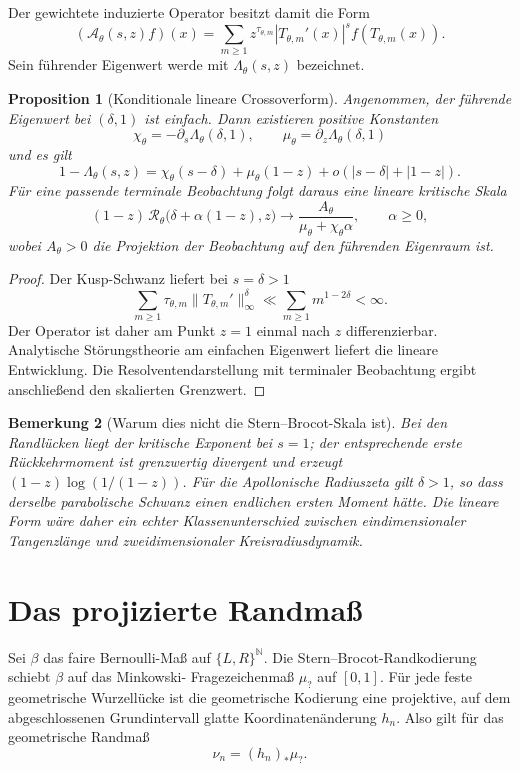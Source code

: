 \documentclass[11pt,a4paper]{article}
\newtheorem{remark}{Bemerkung}[section]
\newtheorem{proposition}[remark]{Proposition}
\begin{document}
Der gewichtete induzierte Operator besitzt damit die Form
\[
 (\mathcal A_\theta(s,z)f)(x)
 =
 \sum_{m\ge1}
 z^{\tau_{\theta,m}}
 |T_{\theta,m}'(x)|^s f(T_{\theta,m}(x)).
\]
Sein führender Eigenwert werde mit $\Lambda_\theta(s,z)$ bezeichnet.

\begin{proposition}[Konditionale lineare Crossoverform]
Angenommen, der führende
Eigenwert bei $(\delta,1)$ ist einfach. Dann existieren positive
Konstanten
\[
 \chi_\theta=-\partial_s\Lambda_\theta(\delta,1),
 \qquad
 \mu_\theta=\partial_z\Lambda_\theta(\delta,1)
\]
und es gilt
\[
 1-\Lambda_\theta(s,z)
 =
 \chi_\theta(s-\delta)
 +\mu_\theta(1-z)
 +o\!\left(|s-\delta|+|1-z|\right).
\]
Für eine passende terminale Beobachtung folgt daraus eine lineare
kritische Skala
\[
 (1-z)\,
 \mathscr R_\theta\bigl(\delta+\alpha(1-z),z\bigr)
 \longrightarrow
 \frac{A_\theta}{\mu_\theta+\chi_\theta\alpha},
 \qquad \alpha\ge0,
\]
wobei $A_\theta>0$ die Projektion der Beobachtung auf den führenden
Eigenraum ist.
\end{proposition}

\begin{proof}
Der Kusp-Schwanz liefert bei $s=\delta>1$
\[
 \sum_{m\ge1}\tau_{\theta,m}
 \|T_{\theta,m}'\|_\infty^\delta
 \ll
 \sum_{m\ge1}m^{1-2\delta}<\infty.
\]
Der Operator ist daher am Punkt $z=1$ einmal nach $z$
differenzierbar. Analytische Störungstheorie am einfachen Eigenwert
liefert die lineare Entwicklung. Die Resolventendarstellung mit
terminaler Beobachtung ergibt anschließend den skalierten Grenzwert.
\end{proof}

\begin{remark}[Warum dies nicht die Stern--Brocot-Skala ist]
Bei den Randlücken liegt der kritische Exponent bei $s=1$; der
entsprechende erste Rückkehrmoment ist grenzwertig divergent und
erzeugt $(1-z)\log(1/(1-z))$. Für die Apollonische Radiuszeta gilt
$\delta>1$, so dass derselbe parabolische Schwanz einen endlichen
ersten Moment hätte. Die lineare Form wäre daher ein echter
Klassenunterschied zwischen eindimensionaler Tangenzlänge und
zweidimensionaler Kreisradiusdynamik.
\end{remark}

\section{Das projizierte Randmaß}

Sei $\beta$ das faire Bernoulli-Maß auf $\{L,R\}^{\mathbb N}$. Die
Stern--Brocot-Randkodierung schiebt $\beta$ auf das Minkowski-
Fragezeichenmaß $\mu_{?}$ auf $[0,1]$. Für jede feste geometrische
Wurzellücke ist die geometrische Kodierung eine projektive, auf dem
abgeschlossenen Grundintervall glatte Koordinatenänderung $h_n$. Also gilt
für das geometrische Randmaß
\[
 \nu_n=(h_n)_*\mu_{?}.
\]
\end{document}
